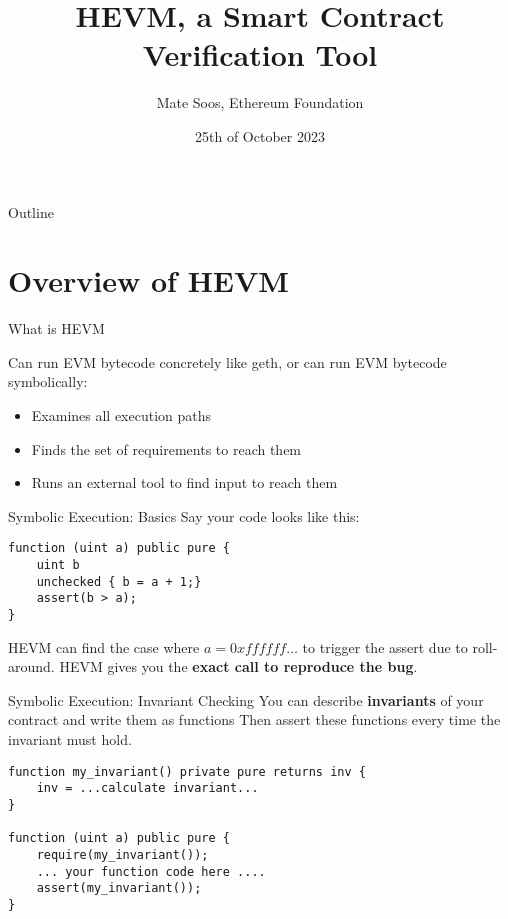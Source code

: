 \documentclass{beamer}
\title{HEVM, a Smart Contract Verification Tool}
\author{Mate Soos, Ethereum Foundation}
\date{25th of October 2023}
\begin{document}
\begin{frame}
    \titlepage 
\end{frame}

\begin{frame}{Outline}
    \tableofcontents
\end{frame}


\section{Overview of HEVM}
\begin{frame}{What is HEVM}

Can run EVM bytecode concretely like geth, or can run EVM bytecode symbolically:
\begin{itemize}
\item Examines all execution paths
\item Finds the set of requirements to reach them
\item Runs an external tool to find input to reach them
\end{itemize}
\end{frame}

\begin{frame}[fragile=singleslide]{Symbolic Execution: Basics}
Say your code looks like this:
\begin{Verbatim}[frame=single, framerule=0.2mm, framesep=2mm,fontsize=\small]
function (uint a) public pure {
	uint b
	unchecked { b = a + 1;}
	assert(b > a);
}
\end{Verbatim}


HEVM can find the case where $a=0xffffff\ldots$ to trigger the assert due to roll-around. HEVM gives you the \textbf{exact call to reproduce the bug}.

\end{frame}

\begin{frame}[fragile=singleslide]{Symbolic Execution: Invariant Checking}
You can describe \textbf{invariants} of your contract and write them as functions Then assert these functions every time the invariant must hold.
\begin{Verbatim}[frame=single, framerule=0.2mm, framesep=2mm,fontsize=\small]
function my_invariant() private pure returns inv {
	inv = ...calculate invariant...
}
	
function (uint a) public pure {
	require(my_invariant());
	... your function code here ....
	assert(my_invariant());
}
\end{Verbatim}
\end{frame}	
\end{document}
